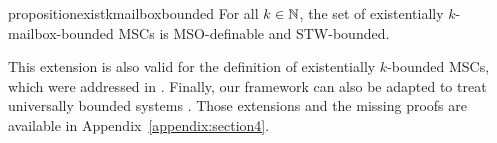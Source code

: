 \documentclass[a4paper,UKenglish,cleveref, autoref, thm-restate]{lipics-v2021}
\def\islongversion{yes}
\def\yes{yes}
\begin{document}



%

%
%
%
% 
\begin{restatable}{proposition}{existkmailboxbounded}\label{prop:exist-k-mailbox-bounded}
	For all $k \in \mathbb{N}$, the set of existentially $k$-mailbox-bounded MSCs
	is MSO-definable and STW-bounded.
\end{restatable}
%
% 

This extension is also valid for the \pp definition of existentially $k$-bounded MSCs, which
were addressed in \cite{GKM07}. Finally, our framework can also be adapted to treat universally bounded systems \cite{HENRIKSEN20051,DBLP:conf/fossacs/LohreyM02}. Those extensions and the missing proofs are available in Appendix~\ref{appendix:section4}.
\end{document}
